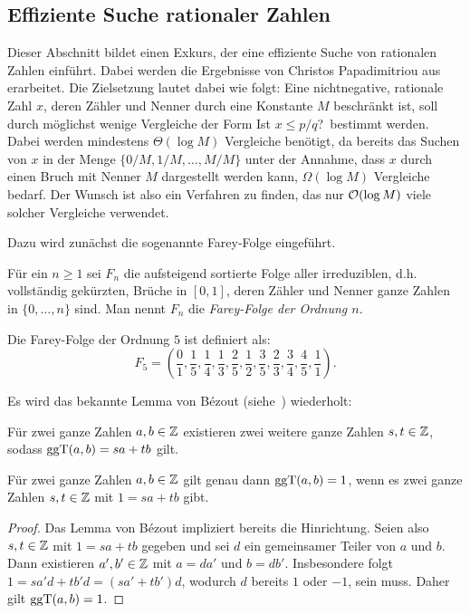 \subsection{Effiziente Suche rationaler Zahlen}\label{sec-rational-search}

Dieser Abschnitt bildet einen Exkurs, der eine effiziente Suche von rationalen Zahlen einführt.
Dabei werden die Ergebnisse von Christos Papadimitriou aus~\cite{Papadimitriou1979} erarbeitet.
Die Zielsetzung lautet dabei wie folgt:
Eine nichtnegative, rationale Zahl $x$, deren Zähler und Nenner durch eine Konstante $M$ beschränkt ist, soll durch möglichst wenige Vergleiche der Form \glqq Ist $x\leq p/q$?\grqq\ bestimmt werden.
Dabei werden mindestens $\Theta(\log M)$ Vergleiche benötigt, da bereits das Suchen von $x$ in der Menge $\{ 0/M, 1/M, \dots, M/M \}$ unter der Annahme, dass $x$ durch einen Bruch mit Nenner $M$ dargestellt werden kann, $\Omega(\log M)$ Vergleiche bedarf.
Der Wunsch ist also ein Verfahren zu finden, das nur $\mathcal{O}(\log M)$ viele solcher Vergleiche verwendet.

Dazu wird zunächst die sogenannte Farey-Folge eingeführt.

\begin{definition}
	Für ein $n\geq 1$ sei $F_n$ die aufsteigend sortierte Folge aller irreduziblen, d.h. vollständig gekürzten, Brüche in $[0,1]$, deren Zähler und Nenner ganze Zahlen in $\{0, \dots, n\}$ sind.
	Man nennt $F_n$ die \emph{Farey-Folge der Ordnung $n$}.
\end{definition}

\begin{example}
	Die Farey-Folge der Ordnung $5$ ist definiert als:
	\[
		F_5 = \left( \frac{0}{1}, \frac{1}{5}, \frac{1}{4}, \frac{1}{3}, \frac{2}{5}, \frac{1}{2}, \frac{3}{5}, \frac{2}{3}, \frac{3}{4}, \frac{4}{5}, \frac{1}{1} \right).
	\]
\end{example}

Es wird das bekannte Lemma von Bézout (siehe~) wiederholt:
\begin{lemma}\label{lemma-von-bezout}
	Für zwei ganze Zahlen $a, b\in\mathbb{Z}$ existieren zwei weitere ganze Zahlen $s,t\in\mathbb{Z}$, sodass $\operatorname{ggT}(a,b) = sa + tb$ gilt.
\end{lemma}

\begin{corollary}\label{cor-bezout-reverted}
	Für zwei ganze Zahlen $a,b\in\mathbb{Z}$ gilt genau dann $\operatorname{ggT}(a,b) = 1$, wenn es zwei ganze Zahlen $s,t\in\mathbb{Z}$ mit $1 = sa + tb$ gibt.
\end{corollary}
\begin{proof}
	Das Lemma von Bézout impliziert bereits die Hinrichtung.
	Seien also $s,t\in\mathbb{Z}$ mit $1= sa +tb$ gegeben und sei $d$ ein gemeinsamer Teiler von $a$ und $b$.
	Dann existieren $a',b'\in\mathbb{Z}$ mit $a=d a'$ und $b=d b'$.
	Insbesondere folgt $1 = sa'd + tb'd = (sa' + tb') d$, wodurch $d$ bereits $1$ oder $-1$, sein muss.
	Daher gilt $\operatorname{ggT}(a,b)=1$.
\end{proof}

